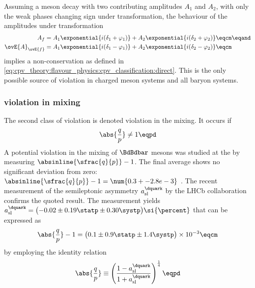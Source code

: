 Assuming a meson decay with two contributing amplitudes $A_1$ and $A_2$, with
only the weak phases changing sign under \CP transformation, the behaviour of
the amplitudes under \CP transformation
%
\begin{equation}
  \begin{split}
                A_{f} &= A_1 \exponential{i(\delta_1 + \varphi_1)} + A_2 \exponential{i(\delta_2 + \varphi_2)} \eqcm\eqand \\
    \ovE{A}_{\ovE{f}} &= A_1 \exponential{i(\delta_1 - \varphi_1)} + A_2 \exponential{i(\delta_2 - \varphi_2)} \eqcm
  \end{split}
\end{equation}
%
implies a \CP non-conservation as defined in
\cref{eq:cpv_theory:flavour_physics:cpv_classification:direct}.
This is the only possible source of \CP violation in charged meson systems and
all baryon systems.

\subsubsection[\CP violation in mixing]{\CPbfsf violation in mixing}
\label{sec:cpv_theory:flavour_physics:cpv_classification:mixing}

The second class of \CP violation is denoted \CP violation in the mixing. It
occurs if
%
\begin{equation}
  \abs{\frac{q}{p}} \neq 1 \eqpd
\end{equation}
%
A potential \CP violation in the mixing of $\BdBdbar$ mesons was studied at the
\BFactories by measuring $\absinline{\sfrac{q}{p}} - 1$. The final \BFactory
average shows no significant deviation from zero: $\absinline{\sfrac{q}{p}} - 1
= \num{0.3 +- 2.8 e-3}$ \cite{Bevan:2014iga}. The recent measurement of the
semileptonic \CP asymmetry $a_{\text{sl}}^{\dquark}$ by the \acs*{LHCb}
collaboration confirms the quoted result. The measurement yields
$a_{\text{sl}}^{\dquark} = \bigl(-0.02 \pm 0.19 \statp \pm 0.30 \systp
\bigr)\si{\percent}$ \cite{Aaij:2014nxa} that can be expressed as
%
\begin{equation}
  \abs{\frac{q}{p}} - 1 = \bigl(0.1 \pm 0.9 \statp \pm 1.4 \systp \bigr) \times 10^{-3} \eqcm
\end{equation}
%
by employing the identity relation
%
\begin{equation}
  \abs{\frac{q}{p}} \equiv \left(\frac{1 - a_{\text{sl}}^{\dquark}}{1 + a_{\text{sl}}^{\dquark}}\right)^{\frac{1}{4}} \eqpd
\end{equation}
%

